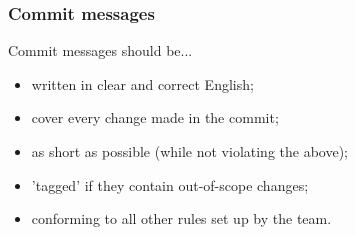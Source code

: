 \begin{frame}
	\frametitle{Commit messages}
	Commit messages should be...
	\begin{itemize}[<+-| highlight@+>]
		\item written in clear and correct English;
		\item cover every change made in the commit;
		\item as short as possible (while not violating the above);
		\item 'tagged' if they contain out-of-scope changes;
		\item conforming to all other rules set up by the team.
	\end{itemize}
\end{frame}

